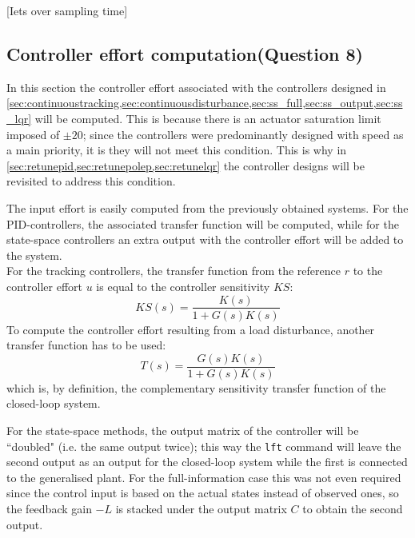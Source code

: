 [Iets over sampling time]
\subsection{Controller effort computation\textnormal{\phantom{xxx}(Question 8)}}
In this section the controller effort associated with the controllers designed in \cref{sec:continuoustracking,sec:continuousdisturbance,sec:ss_full,sec:ss_output,sec:ss_lqr} will be computed. This is because there is an actuator saturation limit imposed of $\pm20$; since the controllers were predominantly designed with speed as a main priority, it is they will not meet this condition. This is why in \cref{sec:retunepid,sec:retunepolep,sec:retunelqr} the controller designs will be revisited to address this condition.

The input effort is easily computed from the previously obtained systems. For the PID-controllers, the associated transfer function will be computed, while for the state-space controllers an extra output with the controller effort will be added to the system.\\
\indent For the tracking controllers, the transfer function from the reference $r$ to the controller effort $u$ is equal to the controller sensitivity $KS$:
$$ KS(s) = \frac{K(s)}{1 + G(s)K(s)} $$
To compute the controller effort resulting from a load disturbance, another transfer function has to be used:
$$ T(s) = \frac{G(s)K(s)}{1 + G(s)K(s)}$$
which is, by definition, the complementary sensitivity transfer function of the closed-loop system. 

For the state-space methods, the output matrix of the controller will be ``doubled" (i.e. the same output twice); this way the \texttt{lft} command will leave the second output as an output for the closed-loop system while the first is connected to the generalised plant. For the full-information case this was not even required since the control input is based on the actual states instead of observed ones, so the feedback gain $-L$ is stacked under the output matrix $C$ to obtain the second output.

